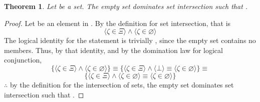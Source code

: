 \documentclass[preview]{standalone}
\newtheorem{theorem}{Theorem}
\begin{document}
\begin{theorem} %
    Let \bm{$\Xi$} be a set. 
    The empty set dominates set intersection such that 
    \bm{$\Xi \cap \varnothing = \varnothing$}.
\end{theorem}
\begin{proof}
    Let \bm{$\zeta$} be an element in \bm{$\Xi \cap \varnothing$}. 
    By the definition for set intersection, that is 
    \begin{equation*}
        \Big \langle \zeta \in \Xi \Big \rangle 
            \land 
        \Big \langle \zeta \in \varnothing \Big \rangle
    \end{equation*}
    The logical identity for the statement \bm{$\zeta \in \varnothing$} is trivially \bm{$\bot$}, 
    since the empty set contains no members. 
    Thus, by that identity, 
    and by the domination law for logical conjunction,
    \begin{equation*}
        \Bigg\{
            \Big \langle \zeta \in \Xi \Big \rangle 
                \land 
            \Big \langle \zeta \in \varnothing \Big \rangle
        \Bigg\}
            \equiv
        \Bigg\{
            \Big \langle \zeta \in \Xi \Big \rangle 
                \land 
            \Big \langle \bot \Big \rangle
                \equiv
            \Big \langle \zeta \in \varnothing \Big \rangle
        \Bigg\}
            \equiv
    \end{equation*}
    \begin{equation*}
        \Bigg\{
            \Big \langle \zeta \in \Xi \Big \rangle 
                \land 
            \Big \langle \zeta \in \varnothing \Big \rangle
                \equiv
            \Big \langle \zeta \in \varnothing \Big \rangle
        \Bigg\}
    \end{equation*}
    $\therefore$ by the definition for the intersection of sets,
    the empty set dominates set intersection such that 
    \bm{$\Xi \cap \varnothing = \varnothing$}.
\end{proof}
\end{document}
